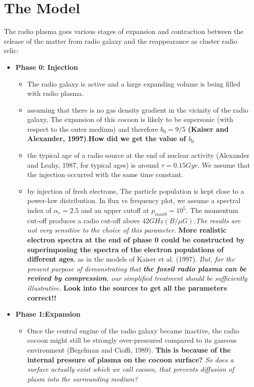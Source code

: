 \documentclass[11pt]{report}
\newcommand{\tbf}[1]{\textbf{#1}}
\newcommand{\tit}[1]{\textit{#1}}
\begin{document}
\section{The Model}
The radio plasma goes various stages of expansion and contraction between the release of the matter from radio galaxy and the reappearance as cluster radio relic:
\begin{itemize}
\item \tbf{Phase 0: Injection}
\begin{itemize}
\item The radio galaxy is active and a large expanding volume is being filled with radio plasma.
\item assuming that there is no gas density gradient in the vicinity of the radio galaxy, The expansion of this cocoon is likely to be supersonic (with respect to the outer medium) and therefore $b_0 = 9/5$ \tbf{(Kaiser and Alexander, 1997)}.\tbf{How did we get the value of $b_0$}
\item the typical age of a radio source at the end of nuclear activity (Alexander and Leahy, 1987, for typical ages) is around $\tau=0.15 Gyr$. We assume that the injection occurred with the same time constant.
\item by injection of fresh electrons, The particle population is kept close to a power-law distribution. In flux vs frequency plot, we assume a  spectral index of $\alpha_e = 2.5$ and an upper cutoff at $p_{max0} = 10^5$. The momentum cut-off produces a radio cut-off above $42GHz(B/\mu G)$.\tit{The results are not very sensitive to the choice of this parameter.} \tbf{ More realistic electron spectra at the end of phase 0 could be constructed by superimposing the spectra of the electron populations of different ages}, as in the models of Kaiser et al. (1997). \tit{But, for the present purpose of demonstrating that \tbf{the fossil radio plasma can be revived by compression}, our simplified treatment should be sufficiently illustrative. }\tbf{Look into the sources to get all the parameters correct!!}
\end{itemize}
\item \tbf{Phase 1:Expansion}
\begin{itemize}
\item Once the central engine of the radio galaxy became inactive, the radio cocoon might still be strongly over-pressured compared to its gaseous environment (Begelman and Cioffi, 1989). \textbf{This is because of the internal pressure of plasma on the cocoon surface?}\tit{ So does a surface actually exist which we call cocoon, that prevents diffusion of plasm into the surrounding medium?}

\end{itemize}
\end{itemize}
\end{document}
